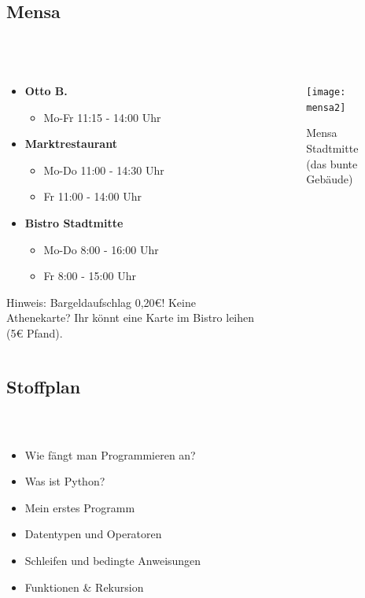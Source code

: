 \subsection{Mensa}
\begin{frame}
	\frametitle{\insertsectionhead \\ {\small \insertsubsectionhead}}
	\begin{columns}
		\begin{column}{5cm}
			\begin{itemize}
				\item \textbf{Otto B.}
				\begin{itemize}
					\item Mo-Fr 11:15 - 14:00 Uhr
				\end{itemize}
				\item \textbf{Marktrestaurant}
				\begin{itemize}
					\item Mo-Do 11:00 - 14:30 Uhr
					\item Fr 11:00 - 14:00 Uhr
				\end{itemize}
				\item \textbf{Bistro Stadtmitte }
				\begin{itemize}
					\item Mo-Do 8:00 - 16:00 Uhr
					\item Fr 8:00 - 15:00 Uhr
				\end{itemize}
			\end{itemize}
			\begin{block}{Hinweis:}
				Bargeldaufschlag 0,20€! Keine Athenekarte? Ihr könnt eine Karte im Bistro leihen (5€ Pfand).
			\end{block}
		\end{column}
		\begin{column}{7.2cm}
			\vspace{-2.5ex}
			\begin{figure}
				\texttt{[image: mensa2]}
				\caption{Mensa Stadtmitte (das bunte Gebäude)}
			\end{figure}
		\end{column}
	\end{columns}
\end{frame}


\subsection{Stoffplan}
\begin{frame}
	\frametitle{\insertsectionhead \\ {\small \insertsubsectionhead}}
	\begin{itemize}
		\item Wie fängt man Programmieren an?
		\item Was ist Python?
		\item Mein erstes Programm
		\item Datentypen und Operatoren
		\item Schleifen und bedingte Anweisungen
		\item Funktionen \& Rekursion
	\end{itemize}
\end{frame}

